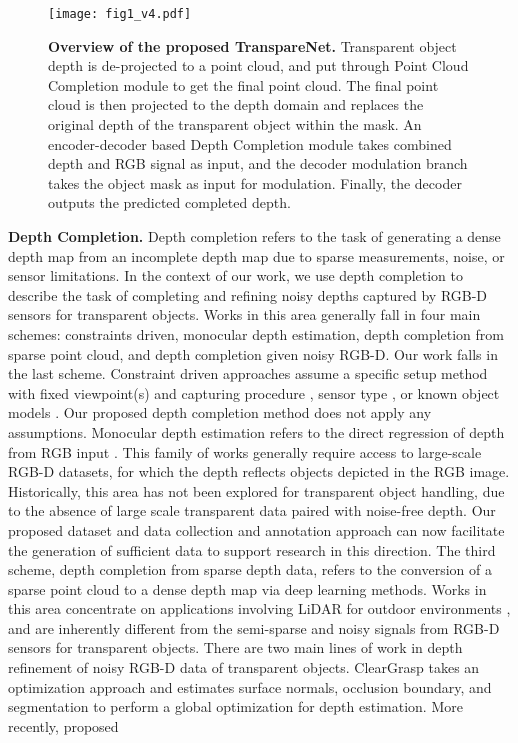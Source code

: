 \documentclass{article}
\newcommand{\algoName}{TranspareNet\xspace}
\begin{document}
\begin{figure}[t!]
\centering
\texttt{[image: fig1\_v4.pdf]}
\caption{\textbf{Overview of the proposed \algoName.} Transparent object depth is de-projected to a point cloud, and put through Point Cloud Completion module to get the final point cloud. The final point cloud is then projected to the depth domain and replaces the original depth of the transparent object within the mask. An encoder-decoder based Depth Completion module takes combined depth and RGB signal as input, and the decoder modulation branch takes the object mask as input for modulation. Finally, the decoder outputs the predicted completed depth.}
\label{fig:architecture}
\end{figure}

\textbf{Depth Completion.} Depth completion refers to the task of generating a dense depth map from an incomplete depth map due to sparse measurements, noise, or sensor limitations. In the context of our work, we use depth completion to describe the task of completing and refining noisy depths captured by RGB-D sensors for transparent objects. Works in this area generally fall in four main schemes: constraints driven, monocular depth estimation, depth completion from sparse point cloud, and depth completion given noisy RGB-D. Our work falls in the last scheme. Constraint driven approaches assume a specific setup method with fixed viewpoint(s) and capturing procedure \cite{7299026,7780842,s20236790,Albrecht2013SeeingTU,fusingdepth}, sensor type \cite{song2017,song2018depth,zhou2020lit}, or known object models \citep{6630571,Phillips2016SeeingGF,Klank}. Our proposed depth completion method does not apply any assumptions. Monocular depth estimation refers to the direct regression of depth from RGB input \cite{eigen2014depth,ranftl2020robust,laina2016deeper,chen2017singleimage,garg2016unsupervised,godard2017unsupervised,xu2017multiscale,hao2018preserving,xu2018structured,fu2018deep,hu2018revisiting,huynh2020guiding,lee2020big,alhashim2019high}. This family of works generally require access to large-scale RGB-D datasets, for which the depth reflects objects depicted in the RGB image. Historically, this area has not been explored for transparent object handling, due to the absence of large scale transparent data paired with noise-free depth. Our proposed dataset and data collection and annotation approach can now facilitate the generation of sufficient data to support research in this direction. The third scheme, depth completion from sparse depth data, refers to the conversion of a sparse point cloud to a dense depth map via deep learning methods. Works in this area concentrate on applications involving LiDAR for outdoor environments \cite{cheng2019cspn, uhrig2017sparsity,tang2019learning,cheng2020s3cnet}, and are inherently different from the semi-sparse and noisy signals from RGB-D sensors for transparent objects. There are two main lines of work in depth refinement of noisy RGB-D data of transparent objects. ClearGrasp \citep{ClearGrasp} takes an optimization approach and estimates surface normals, occlusion boundary, and segmentation to perform a global optimization for depth estimation. More recently, \citep{zhu2021rgbd} proposed 
\end{document}
